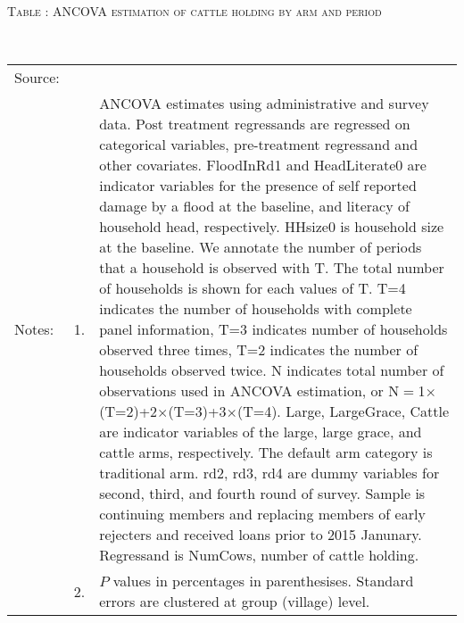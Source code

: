 \hspace{-1cm}\begin{minipage}[t]{14cm}
\hfil\textsc{\normalsize Table \thetable: ANCOVA estimation of cattle holding by arm and period\label{tab ANCOVA cow time varying}}\\
\setlength{\tabcolsep}{1pt}
\setlength{\baselineskip}{8pt}
\renewcommand{\arraystretch}{.55}
\hfil{}\\
\renewcommand{\arraystretch}{.8}
\setlength{\tabcolsep}{1pt}
\begin{tabular}{>{\hfill\scriptsize}p{1cm}<{}>{\hfill\scriptsize}p{.25cm}<{}>{\scriptsize}p{12cm}<{\hfill}}
Source:& \multicolumn{2}{l}{\scriptsize Estimated with GUK administrative and survey data.}\\
Notes: & 1. & ANCOVA estimates using administrative and survey data. Post treatment regressands are regressed on categorical variables, pre-treatment regressand and other covariates. \textsf{FloodInRd1} and \textsf{HeadLiterate0} are indicator variables for the presence of self reported damage by a flood at the baseline, and literacy of household head, respectively. \textsf{HHsize0} is household size at the baseline. We annotate the number of periods that a household is observed with \textsf{T}. The total number of households is shown for each values of \textsf{T}. \textsf{T=4} indicates the number of households with complete panel information, \textsf{T=3} indicates number of households observed three times, \textsf{T=2} indicates the number of households observed twice. \textsf{N} indicates total number of observations used in ANCOVA estimation, or \textsf{N$=$1$\times$(T=2)+2$\times$(T=3)+3$\times$(T=4)}.  \textsf{Large}, \textsf{LargeGrace}, \textsf{Cattle} are indicator variables of the \textsf{large}, \textsf{large grace}, and \textsf{cattle} arms, respectively. The default arm category is \textsf{traditional} arm. \textsf{rd2, rd3, rd4} are dummy variables for second, third, and fourth round of survey. Sample is continuing members and replacing members of early rejecters and received loans prior to 2015 Janunary. Regressand is \textsf{NumCows}, number of cattle holding. \\
& 2. & $P$ values in percentages in parenthesises. Standard errors are clustered at group (village) level.
\end{tabular}
\end{minipage}

